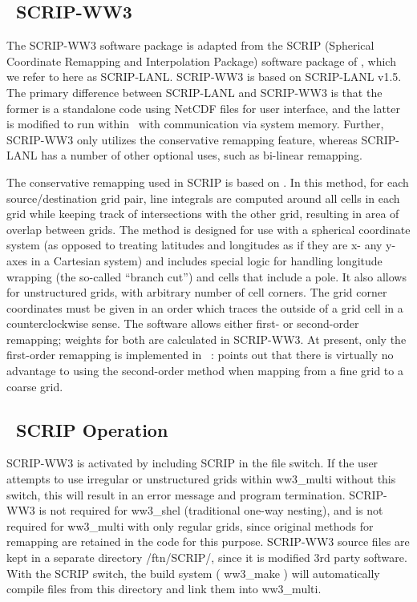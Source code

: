 \vssub
\subsection{~SCRIP-WW3} \label{sec:scripB}
\vssub

The SCRIP-WW3 software package is adapted from the {\F SCRIP} (Spherical
Coordinate Remapping and Interpolation Package) software package of
\cite{man:Jones98}, which we refer to here as SCRIP-LANL. SCRIP-WW3 is based
on SCRIP-LANL v1.5. The primary difference between SCRIP-LANL and SCRIP-WW3 is
that the former is a standalone code using NetCDF files for user interface,
and the latter is modified to run within \ws\, with communication via system
memory. Further, SCRIP-WW3 only utilizes the conservative remapping feature,
whereas SCRIP-LANL has a number of other optional uses, such as bi-linear
remapping.

The conservative remapping used in SCRIP is based on \cite{art:Jones99}. In
this method, for each source/destination grid pair, line integrals are
computed around all cells in each grid while keeping track of intersections
with the other grid, resulting in area of overlap between grids. The method is
designed for use with a spherical coordinate system (as opposed to treating
latitudes and longitudes as if they are x- any y-axes in a Cartesian system)
and includes special logic for handling longitude wrapping (the so-called
``branch cut'') and cells that include a pole. It also allows for unstructured
grids, with arbitrary number of cell corners. The grid corner coordinates must
be given in an order which traces the outside of a grid cell in a
counterclockwise sense. The software allows either first- or second-order
remapping; weights for both are calculated in SCRIP-WW3. At present, only the
first-order remapping is implemented in \ws\ : \cite{art:Jones99} points out
that there is virtually no advantage to using the second-order method when
mapping from a fine grid to a coarse grid.

\vssub
\subsection{~SCRIP Operation} \label{sec:scripC}
\vssub

SCRIP-WW3 is activated by including {\F SCRIP} in the file {\file switch}. If
the user attempts to use irregular or unstructured grids within {\file
  ww3\_multi} without this switch, this will result in an error message and
program termination. SCRIP-WW3 is not required for {\file ww3\_shel}
(traditional one-way nesting), and is not required for {\file ww3\_multi} with
only regular grids, since original methods for remapping are retained in the
code for this purpose. SCRIP-WW3 source files are kept in a separate
directory {\file /ftn/SCRIP/}, since it is modified 3rd party software. With
the {\F SCRIP} switch, the build system ( {\file ww3\_make} ) will
automatically compile files from this directory and link them into {\file
  ww3\_multi}.

